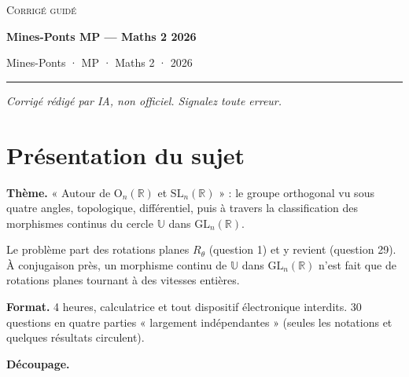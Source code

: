 \documentclass[11pt,a4paper]{article}
\begin{document}
\thispagestyle{plain}
\begin{center}
  {\small\scshape Corrigé guidé}\par\smallskip
  {\LARGE\bfseries Mines-Ponts MP — Maths 2 2026\par}\medskip
  {\large Mines-Ponts · MP · Maths 2 · 2026\par}
\end{center}
\vspace{2pt}\hrule\vspace{8pt}

\emph{Corrigé rédigé par IA, non officiel. Signalez toute erreur.}

\hypertarget{pruxe9sentation-du-sujet}{%
\section{Présentation du sujet}\label{pruxe9sentation-du-sujet}}

\textbf{Thème.} « Autour de \({\mathrm{O}}_n(\mathbb{R})\) et \({\mathrm{SL}}_n(\mathbb{R})\) » : le groupe orthogonal vu sous quatre angles, topologique, différentiel, puis à travers la classification des morphismes continus du cercle \(\mathbb{U}\) dans \({\mathrm{GL}}_n(\mathbb{R})\).

Le problème part des rotations planes \(R_\theta\) (question 1) et y revient (question 29). À conjugaison près, un morphisme continu de \(\mathbb{U}\) dans \({\mathrm{GL}}_n(\mathbb{R})\) n'est fait que de rotations planes tournant à des vitesses entières.

\textbf{Format.} 4 heures, calculatrice et tout dispositif électronique interdits. 30 questions en quatre parties « largement indépendantes » (seules les notations et quelques résultats circulent).

\textbf{Découpage.}
\end{document}
